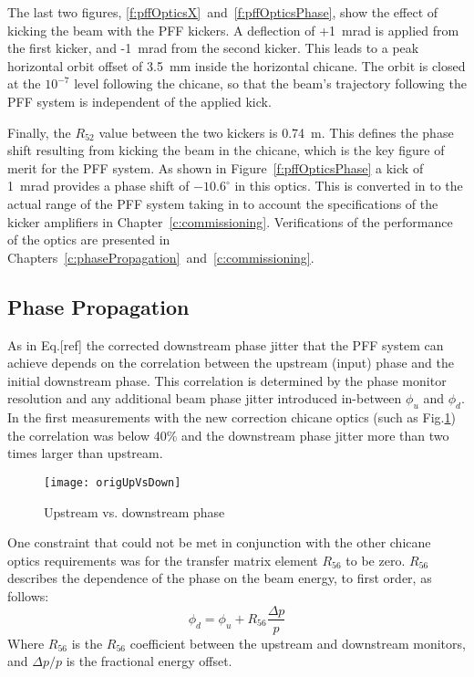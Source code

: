 The last two figures, \ref{f:pffOpticsX}~and~\ref{f:pffOpticsPhase}, show the 
effect of kicking the beam with the PFF kickers. A deflection of +1~mrad is 
applied from the first kicker, and -1~mrad from the second kicker. This leads 
to a peak horizontal orbit offset of 3.5~mm inside the horizontal chicane. The 
orbit is closed at the \(10^{-7}\) level following the chicane, so that the 
beam's trajectory following the PFF system is independent of the applied kick. 

Finally, the \(R_{52}\) value between the two kickers is 0.74~m. This defines 
the phase shift resulting from kicking the beam in the chicane, which is the 
key figure of merit for the PFF system. As shown in 
Figure~\ref{f:pffOpticsPhase} a kick of 1~mrad provides a phase shift of 
\(-10.6^\circ\) in this optics. This is converted in to the actual range of the 
PFF system taking in to account the specifications of the kicker amplifiers in 
Chapter~\ref{c:commissioning}. Verifications of the performance of the optics 
are presented in Chapters~\ref{c:phasePropagation}~and~\ref{c:commissioning}.

\subsection{\label{ss:prop}Phase Propagation}

As in Eq.[ref] the corrected downstream phase jitter that the PFF system can 
achieve depends on the correlation between the upstream (input) phase and the 
initial downstream phase. This correlation is determined by the phase monitor 
resolution and any additional beam phase jitter introduced in-between 
\(\phi_u\) and \(\phi_d\). In the first measurements with the new correction 
chicane optics (such as Fig.\ref{f:origUpVsDown}) the correlation was below 
40\% and the downstream phase jitter more than two times larger than upstream. 

\begin{figure}
  \centering
  \texttt{[image: origUpVsDown]}%
  \caption{\label{f:origUpVsDown} Upstream vs. downstream phase
  }
\end{figure}

One constraint that could not be met in conjunction with the other chicane 
optics requirements was for the transfer matrix element \(R_{56}\) to be zero. 
\(R_{56}\) describes the dependence of the phase on the beam energy, to first 
order, as 
follows: 
\begin{equation}
\phi_d = \phi_u + R_{56}\frac{\Delta p}{p}
\label{e:r56PhasEq}
\end{equation}
Where \(R_{56}\) is the \(R_{56}\) coefficient between the upstream and 
downstream monitors, and \(\Delta p/p\) is the fractional energy offset.

